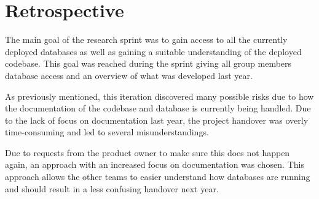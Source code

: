 \section{Retrospective}
The main goal of the research sprint was to gain access to all the currently deployed databases as well 
as gaining a suitable understanding of the deployed codebase. This goal was reached during the sprint 
giving all group members database access and an overview of what was developed last year. 

As previously mentioned, this iteration discovered many possible risks due to how the documentation of the codebase and database is currently being handled. 
Due to the lack of focus on documentation last year, the project handover was overly time-consuming and led to several misunderstandings.

Due to requests from the product owner to make sure this does not happen again, an approach with an increased focus on documentation was chosen. 
This approach allows the other teams to easier understand how databases are running and should result in a less confusing handover next year.


